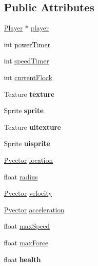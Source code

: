 \subsection*{Public Attributes}
\begin{DoxyCompactItemize}
\item 
\hyperlink{class_player}{Player} $\ast$ \hyperlink{class_boid_ab5e134ab60644014edeff8d84a8187e6}{player}
\item 
int \hyperlink{class_boid_a33dde2d19ee395c259f90fe2b463b0b1}{power\+Timer}
\item 
int \hyperlink{class_boid_a67c611146020a06068a82e5ebf9bf837}{speed\+Timer}
\item 
int \hyperlink{class_boid_a0003756062f939e9781d84f2dcd5a1cc}{current\+Flock}
\item 
Texture {\bfseries texture}\hypertarget{class_boid_aeded40126cf8edac56759d0ec39351d3}{}\label{class_boid_aeded40126cf8edac56759d0ec39351d3}

\item 
Sprite {\bfseries sprite}\hypertarget{class_boid_ac4b36d33d698f68e2638252c747bbc4a}{}\label{class_boid_ac4b36d33d698f68e2638252c747bbc4a}

\item 
Texture {\bfseries uitexture}\hypertarget{class_boid_aa1dcb7e4e304a476f0a4878aacadb21d}{}\label{class_boid_aa1dcb7e4e304a476f0a4878aacadb21d}

\item 
Sprite {\bfseries uisprite}\hypertarget{class_boid_ad2623593e526100d07895daedee6d3af}{}\label{class_boid_ad2623593e526100d07895daedee6d3af}

\item 
\hyperlink{class_pvector}{Pvector} \hyperlink{class_boid_a92a7f1ed6423149cd8a28426695d127e}{location}
\item 
float \hyperlink{class_boid_ac6f5c1abc120b30b0b24d78062e317cc}{radius}
\item 
\hyperlink{class_pvector}{Pvector} \hyperlink{class_boid_af79ca165b4d1a6ad1db2cbc534095bab}{velocity}
\item 
\hyperlink{class_pvector}{Pvector} \hyperlink{class_boid_ac29a50172433e865b12e1023f00f90c0}{acceleration}
\item 
float \hyperlink{class_boid_ac57e1058fb698a542990405ecfd1d88b}{max\+Speed}
\item 
float \hyperlink{class_boid_a2a6d579118276efaeac7ba0e4b872afd}{max\+Force}
\item 
float {\bfseries health}\hypertarget{class_boid_a1e059bba204cff62323c2e36797029de}{}\label{class_boid_a1e059bba204cff62323c2e36797029de}

\end{DoxyCompactItemize}


